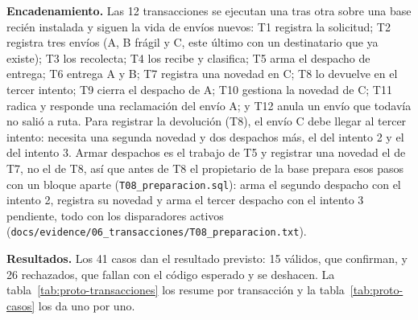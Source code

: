 \textbf{Encadenamiento.} Las 12 transacciones se ejecutan una tras otra
sobre una base recién instalada y siguen la vida de envíos nuevos: T1
registra la solicitud; T2 registra tres envíos (A, B frágil y C, este
último con un destinatario que ya existe); T3 los recolecta; T4 los
recibe y clasifica; T5 arma el despacho de entrega; T6 entrega A y B; T7
registra una novedad en C; T8 lo devuelve en el tercer intento; T9 cierra
el despacho de A; T10 gestiona la novedad de C; T11 radica y responde una
reclamación del envío A; y T12 anula un envío que todavía no salió a
ruta. Para registrar la devolución (T8), el envío C debe llegar al
tercer intento: necesita una segunda novedad y dos despachos más, el del
intento 2 y el del intento 3. Armar despachos es el trabajo de T5 y
registrar una novedad el de T7, no el de T8, así que antes de T8 el
propietario de la base prepara esos pasos con un bloque aparte
(\texttt{T08\_preparacion.sql}): arma el segundo despacho con el intento
2, registra su novedad y arma el tercer despacho con el intento 3
pendiente, todo con los disparadores activos
(\texttt{docs/evidence/06\_transacciones/T08\_preparacion.txt}).

\textbf{Resultados.} Los 41 casos dan el resultado previsto: 15 válidos,
que confirman, y 26 rechazados, que fallan con el código esperado y se
deshacen. La tabla~\ref{tab:proto-transacciones} los resume por
transacción y la tabla~\ref{tab:proto-casos} los da uno por uno.

